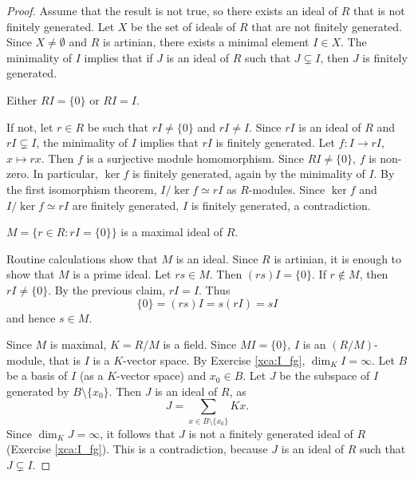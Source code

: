 \begin{proof}
    Assume that the result is not true, so there exists an ideal of $R$ 
    that is not finitely generated. 
    Let $X$ be the set of ideals of $R$ that are not finitely generated. 
    Since $X\ne\emptyset$ and $R$ is artinian, there exists a minimal 
    element $I\in X$. The minimality of $I$ implies that 
    if $J$ is an ideal of $R$ such that $J\subsetneq I$, then 
    $J$ is finitely generated. 

    \begin{claim}
        Either $RI=\{0\}$ or $RI=I$.
    \end{claim}
    
    If not, let $r\in R$ be such that $rI\ne\{0\}$ and $rI\ne I$. 
    Since $rI$ is an ideal of $R$ and
    $rI\subsetneq I$, the minimality of $I$ implies that 
    $rI$ is finitely generated. Let 
    $f\colon I\to rI$, $x\mapsto rx$. Then $f$ is a 
    surjective module homomorphism. Since $RI\ne\{0\}$, 
    $f$ is non-zero. In particular, $\ker f$ 
    is finitely generated, again by the minimality of $I$. 
    By the first isomorphism theorem, $I/\ker f\simeq rI$ as $R$-modules.
    Since $\ker f$ and $I/\ker f\simeq rI$ are finitely generated, 
    $I$ is finitely generated, a contradiction.
    
    \begin{claim}
        $M=\{r\in R:rI=\{0\}\}$ is a maximal ideal of $R$. 
    \end{claim}
    
    Routine calculations show that $M$ is an ideal. Since 
    $R$ is artinian, it is enough to show that $M$ is a prime ideal. 
    Let $rs\in M$. Then $(rs)I=\{0\}$. If $r\not\in M$, 
    then $rI\ne\{0\}$. By the previous claim, $rI=I$. Thus
    \[
    \{0\}=(rs)I=s(rI)=sI
    \]
    and hence $s\in M$.     
    
    \medskip
    Since $M$ is maximal, $K=R/M$ is a field. 
    Since $MI=\{0\}$, $I$ is an $(R/M)$-module, that is 
    $I$ is a $K$-vector space. By Exercise \ref{xca:I_fg}, 
    $\dim_KI=\infty$. Let $B$ be a basis of $I$ (as a $K$-vector space) 
    and $x_0\in B$. Let $J$ be the subspace of $I$ generated by
    $B\setminus\{x_0\}$. Then $J$ is an ideal of $R$, 
    as  
    \[
    J=\sum_{x\in B\setminus\{x_0\}} Kx. 
    \]
    Since $\dim_K J=\infty$, it follows that $J$ 
    is not a finitely generated ideal of $R$ 
    (Exercise \ref{xca:I_fg}). 
    This is a contradiction, because $J$ is an ideal of $R$
    such that $J\subsetneq I$. 
\end{proof}
